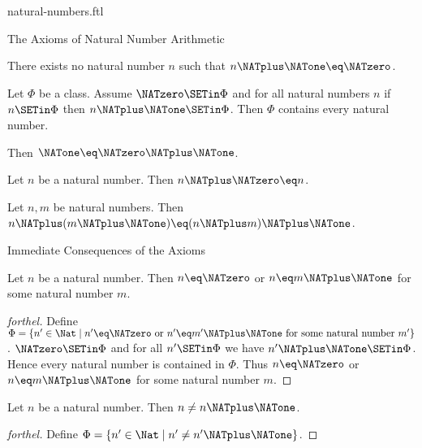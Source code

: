 \documentclass{stex}
\begin{document}
\begin{smodule}{natural-numbers.ftl}
\begin{sfragment}{The Axioms of Natural Number Arithmetic}
  \begin{axiom}[forthel,id=ARITHMETIC_01_4454289938317312]
    There exists no natural number $n$ such that $n \NATplus \NATone \eq \NATzero$.
  \end{axiom}

  \begin{axiom}[forthel,title=Induction,id=ARITHMETIC_01_4764664342773760]
    Let $\Phi$ be a class.
    Assume $\NATzero \SETin \Phi$ and for all natural numbers $n$ if $n \SETin \Phi$ then
    $n \NATplus \NATone \SETin \Phi$.
    Then $\Phi$ contains every natural number.
  \end{axiom}

  \begin{axiom}[forthel,id=ARITHMETIC_03_5962332515874540]
    Then $\NATone \eq \NATzero \NATplus \NATone$.
  \end{axiom}

  \begin{axiom}[forthel,id=ARITHMETIC_03_4827955356237824]
    Let $n$ be a natural number.
    Then $n \NATplus \NATzero \eq n$.
  \end{axiom}

  \begin{axiom}[forthel,id=ARITHMETIC_03_4427935386238924]
    Let $n, m$ be natural numbers.
    Then $n \NATplus (m \NATplus \NATone) \eq (n \NATplus m) \NATplus \NATone$.
  \end{axiom}
\end{sfragment}

\begin{sfragment}{Immediate Consequences of the Axioms}
  \begin{proposition}[forthel,id=ARITHMETIC_01_4966080109871104]
    Let $n$ be a natural number.
    Then $n \eq \NATzero$ or $n \eq m \NATplus \NATone$ for some natural number $m$.
  \end{proposition}
  \begin{proof}[forthel]
    Define $\Phi = \{ n' \in \Nat \mid n' \eq \NATzero\text{ or }n' \eq m' \NATplus \NATone\text{ for some natural number }m' \}$.
    $\NATzero \SETin \Phi$ and for all $n' \SETin  \Phi$ we have $n' \NATplus \NATone \SETin \Phi$.
    Hence every natural number is contained in $\Phi$.
    Thus $n \eq \NATzero$ or $n \eq m \NATplus \NATone$ for some natural number $m$.
  \end{proof}

  \begin{proposition}[forthel,id=ARITHMETIC_01_5996049267163136]
    Let $n$ be a natural number.
    Then $n \neq n \NATplus \NATone$.
  \end{proposition}
  \begin{proof}[forthel]
    Define $\Phi = \{ n' \in \Nat \mid n' \neq n' \NATplus \NATone \}$.


\end{proof}
\end{sfragment}
\end{smodule}
\end{document}
